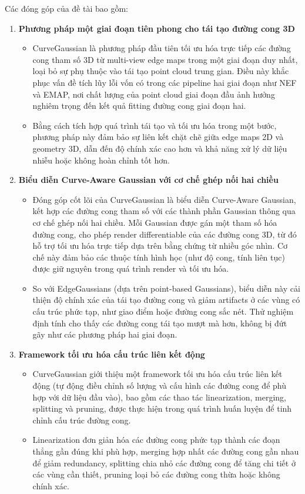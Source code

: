 Các đóng góp của đề tài bao gồm:
\begin{enumerate}
    \item \textbf{Phương pháp một giai đoạn tiên phong cho tái tạo đường cong 3D}
    \begin{itemize}
        \item CurveGaussian là phương pháp đầu tiên tối ưu hóa trực tiếp các đường cong tham số 3D từ multi-view edge maps trong một giai đoạn duy nhất, loại bỏ sự phụ thuộc vào tái tạo point cloud trung gian. Điều này khắc phục vấn đề tích lũy lỗi vốn có trong các pipeline hai giai đoạn như NEF và EMAP, nơi chất lượng của point cloud giai đoạn đầu ảnh hưởng nghiêm trọng đến kết quả fitting đường cong giai đoạn hai.
        \item Bằng cách tích hợp quá trình tái tạo và tối ưu hóa trong một bước, phương pháp này đảm bảo sự liên kết chặt chẽ giữa edge maps 2D và geometry 3D, dẫn đến độ chính xác cao hơn và khả năng xử lý dữ liệu nhiễu hoặc không hoàn chỉnh tốt hơn.
    \end{itemize}
    \item \textbf{Biểu diễn Curve-Aware Gaussian với cơ chế ghép nối hai chiều}
    \begin{itemize}
        \item Đóng góp cốt lõi của CurveGaussian là biểu diễn Curve-Aware Gaussian, kết hợp các đường cong tham số với các thành phần Gaussian thông qua cơ chế ghép nối hai chiều. Mỗi Gaussian được gán một tham số hóa đường cong, cho phép render differentiable của các đường cong 3D, từ đó hỗ trợ tối ưu hóa trực tiếp dựa trên bằng chứng từ nhiều góc nhìn. Cơ chế này đảm bảo các thuộc tính hình học (như độ cong, tính liên tục) được giữ nguyên trong quá trình render và tối ưu hóa.
        \item So với EdgeGaussians (dựa trên point-based Gaussians), biểu diễn này cải thiện độ chính xác của tái tạo đường cong và giảm artifacts ở các vùng có cấu trúc phức tạp, như giao điểm hoặc đường cong sắc nét. Thử nghiệm định tính cho thấy các đường cong tái tạo mượt mà hơn, không bị đứt gãy như các phương pháp hai giai đoạn.
    \end{itemize}
    \item \textbf{Framework tối ưu hóa cấu trúc liên kết động}
    \begin{itemize}
        \item CurveGaussian giới thiệu một framework tối ưu hóa cấu trúc liên kết động (tự động điều chỉnh số lượng và cấu hình các đường cong để phù hợp với dữ liệu đầu vào), bao gồm các thao tác linearization, merging, splitting và pruning, được thực hiện trong quá trình huấn luyện để tinh chỉnh cấu trúc đường cong. 
        \item Linearization đơn giản hóa các đường cong phức tạp thành các đoạn thẳng gần đúng khi phù hợp, merging hợp nhất các đường cong gần nhau để giảm redundancy, splitting chia nhỏ các đường cong để tăng chi tiết ở các vùng cần thiết, pruning loại bỏ các đường cong thừa hoặc không chính xác.
    \end{itemize}
\end{enumerate}
\newpage

